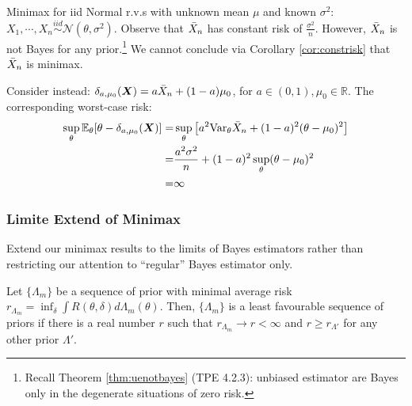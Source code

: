 \begin{example}
    Minimax for iid Normal r.v.s with unknown mean $\mu$ and known $\sigma^2$:
    $X_1,\cdots,X_n\overset{iid}{\sim}\mathcal{N}(\theta,\sigma^2)$.
    Observe that $\Bar{X}_n$ has constant risk of $\frac{\sigma^2}{n}$.
    However, $\Bar{X}_n$ is not Bayes for any prior.\footnote{
    Recall Theorem \ref{thm:uenotbayes} (TPE 4.2.3): 
    unbiased estimator are Bayes only in the degenerate situations of zero risk.
    } We cannot conclude via Corollary \ref{cor:constrisk} that $\Bar{X}_n$ is minimax.

    Consider instead: $\delta_{a,\mu_0}(\boldsymbol{X})=a\Bar{X}_n+(1-a)\mu_0$, 
    for $a\in(0,1),\mu_0\in\mathbb{R}$.
    The corresponding worst-case risk:
    \begin{align}
        \sup_\theta\mathbb{E}_\theta[\theta-\delta_{a,\mu_0}(\boldsymbol{X})]
        =& \sup_\theta\left[
            a^2\mathrm{Var}_\theta\Bar{X}_n
            + (1-a)^2(\theta-\mu_0)^2
        \right]\\
        =& \frac{a^2\sigma^2}{n} + (1-a)^2\sup_{\theta}(\theta-\mu_0)^2\\
        =& \infty
    \end{align}
\end{example}

\subsubsection{Limite Extend of Minimax}
Extend our minimax results to the limits of Bayes estimators 
rather than restricting our attention to ``regular'' Bayes estimator only.

\begin{definition}
    Let $\{\Lambda_m\}$ be a sequence of prior with minimal average risk
    $r_{\Lambda_m}=\inf_\delta\int{R(\theta,\delta)}d\Lambda_m(\theta)$.
    Then, $\{\Lambda_m\}$ is a least favourable sequence of priors 
    if there is a real number $r$ such that $r_{\Lambda_m}\to{r}<\infty$
    and $r\geq{r_{\Lambda'}}$ for any other prior $\Lambda'$.
\end{definition}


